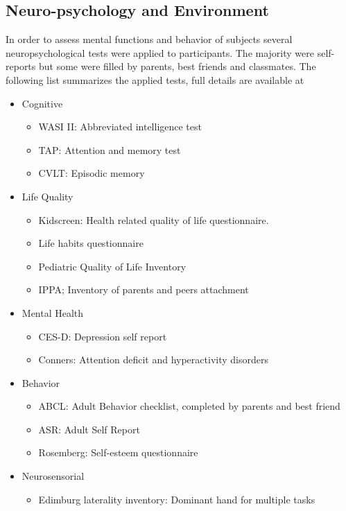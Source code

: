 \subsection{Neuro-psychology and Environment}

In order to assess mental functions and behavior of subjects several neuropsychological tests were applied to participants. The majority were self-reports but some were filled by parents, best friends and classmates. The following list summarizes the applied tests, full details are available at \autocite{FINAL REPORT}

\begin{itemize}
	\item Cognitive
	\begin{itemize}
		\item WASI II: Abbreviated intelligence test
		\item TAP: Attention and memory test
		\item CVLT: Episodic memory
	\end{itemize}
	\item Life Quality
	\begin{itemize}
		\item Kidscreen: Health related quality of life questionnaire.
		\item Life habits questionnaire
		\item Pediatric Quality of Life Inventory 
		\item IPPA; Inventory of parents and peers attachment
	\end{itemize}
	\item Mental Health
	\begin{itemize}
		\item CES-D: Depression self report
		\item Conners: Attention deficit and hyperactivity disorders
	\end{itemize}
	\item Behavior
	\begin{itemize}
		\item ABCL: Adult Behavior checklist, completed by parents and best friend
		\item ASR: Adult Self Report
		\item Rosemberg: Self-esteem questionnaire
	\end{itemize}
	\item Neurosensorial 
	\begin{itemize}
		\item Edimburg laterality inventory: Dominant hand for multiple tasks

\end{itemize}
\end{itemize}
